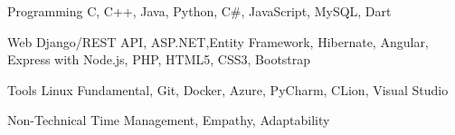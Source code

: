
\begin{cvskills}
  \cvskill
    {Programming} %
    { C, C++,  Java, Python, C\#, JavaScript, MySQL, Dart} %

  \cvskill
    {Web} %
    {Django/REST API, ASP.NET,Entity Framework, Hibernate, Angular, Express with Node.js, PHP, HTML5, CSS3, Bootstrap} %
   
   \cvskill
    {Tools} %
    {Linux Fundamental, Git, Docker, Azure, PyCharm, CLion, Visual Studio} %
    
    \cvskill
    {Non-Technical} %
    {Time Management, Empathy, Adaptability} %
    
\end{cvskills}
